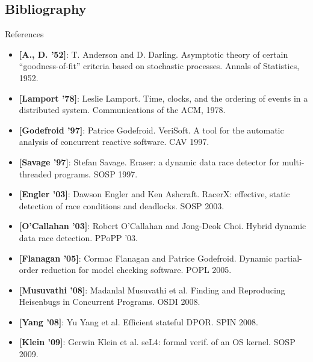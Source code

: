 \documentclass[xcolor=dvipsnames]{beamer}
\begin{document}

\subsection{Bibliography}

\begin{frame}{References}
	\footnotesize
	\begin{itemize}
		\item {\bf [A., D. '52]}: T. Anderson and D. Darling.
			Asymptotic theory of certain ``goodness-of-fit'' criteria based on stochastic processes.
			Annals of Statistics, 1952.
		\item {\bf [Lamport '78]}:
			Leslie Lamport. Time, clocks, and the ordering of events in a distributed system.
			Communications of the ACM, 1978.
		\item {\bf [Godefroid '97]}: Patrice Godefroid.
			VeriSoft. A tool for the automatic analysis of concurrent reactive software. CAV 1997.
		\item {\bf [Savage '97]}: Stefan Savage.
			Eraser: a dynamic data race detector for multi-threaded programs. SOSP 1997.
		\item {\bf [Engler '03]}: Dawson Engler and Ken Ashcraft.
			RacerX: effective, static detection of race conditions and deadlocks. SOSP 2003.
		\item {\bf [O'Callahan '03]}: Robert O'Callahan and Jong-Deok Choi.
			Hybrid dynamic data race detection. PPoPP '03.
		\item {\bf [Flanagan '05]}: Cormac Flanagan and Patrice Godefroid. Dynamic partial-order reduction for
			model checking software. POPL 2005.
		\item {\bf [Musuvathi '08]}: Madanlal Musuvathi et al. Finding and Reproducing Heisenbugs in Concurrent
			Programs. OSDI 2008.
		\item {\bf [Yang '08]}: Yu Yang et al. Efficient stateful DPOR. SPIN 2008.
		\item {\bf [Klein '09]}: Gerwin Klein et al. seL4: formal verif. of an OS kernel. SOSP 2009.
	\end{itemize}
\end{frame}
\end{document}
